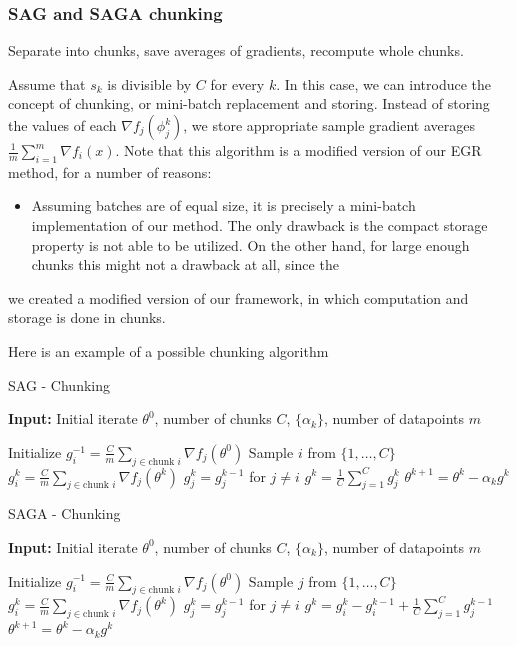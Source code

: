 \documentclass[11pt]{article}
\begin{document}
\subsubsection{SAG and SAGA chunking}
Separate into chunks, save averages of gradients, recompute whole chunks. 


Assume that $s_k$ is divisible by $C$ for every $k$. In this case, we can introduce the concept of chunking, or mini-batch replacement and storing. Instead of storing the values of each $ \nabla f_j(\phi_j^k)$, we store appropriate sample gradient averages $\frac{1}{m} \sum_{i=1}^m  \nabla f_i(x)$. Note that this algorithm is a modified version of our EGR method, for a number of reasons:
\begin{itemize}
	\item Assuming batches are of equal size, it is precisely a mini-batch implementation of our method. The only drawback is the compact storage property is not able to be utilized. On the other hand, for large enough chunks this might not a drawback at all, since the 
\end{itemize}


we created a modified version of our framework, in which computation and storage is done in chunks. 

Here is an example of a possible chunking algorithm

\newpage


\begin{algorithm}
	[H] 
	\caption{SAG - Chunking}
	\label{alg:sag-chunking}
	{\bf Input:} Initial iterate $\theta^0$, number of chunks $C$, $\{ \alpha_k \}$, number of datapoints $m$
	\begin{algorithmic}
		[1] 
		\State Initialize $g_i^{-1} = \frac{C}{m} \sum_{j \in \mbox{chunk } i }  \nabla f_{j}(\theta^0) $
		\State Sample $i$ from $\{ 1, \ldots, C \}$
		\State $ g_i^k = \frac{C}{m} \sum_{j \in \mbox{chunk } i }  \nabla f_{j}(\theta^k) $ 
		\State $ g_j^k = g_j^{k-1} $ for $j \neq i$ 
		\State $g^k = \frac{1}{C} \sum_{j=1}^C g_j^k$ 
		\State $\theta^{k+1} = \theta^k - \alpha_k g^k$ 
		\EndLoop 
	\end{algorithmic}
\end{algorithm}


\begin{algorithm}
	[H] 
	\caption{SAGA - Chunking}
	\label{alg:saga-chunking}
	{\bf Input:} Initial iterate $\theta^0$, number of chunks $C$, $\{ \alpha_k \}$, number of datapoints $m$
	\begin{algorithmic}
		[1] 
		\State Initialize $g_i^{-1} = \frac{C}{m} \sum_{j \in \mbox{chunk } i }  \nabla f_{j}(\theta^0) $
		\State Sample $j$ from $\{ 1, \ldots, C \}$
		\State $g_i^k = \frac{C}{m} \sum_{j\in \mbox{chunk } i }  \nabla f_{j}(\theta^k) $ 
		\State $ g_j^k = g_j^{k-1} $ for $j \neq i$ 
		\State $g^k =  g_i^{k} -  g_i^{k-1}  + \frac{1}{C} \sum_{j = 1}^{C}g_j^{k-1}$ 
		\State $\theta^{k+1} = \theta^k - \alpha_k g^k$ 
		\EndLoop 
	\end{algorithmic}
\end{algorithm}
\end{document}
